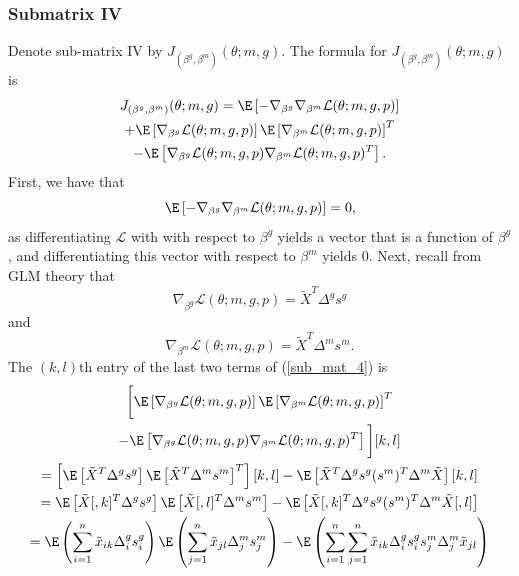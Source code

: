 \documentclass[12pt]{article}
\begin{document}
\begin{appendices}
\subsubsection*{Submatrix IV}
Denote sub-matrix IV by $J_{(\beta^g, \beta^m)}(\theta; m, g)$. The formula for $J_{(\beta^g, \beta^m)}(\theta; m, g)$ is 
\begin{multline}\label{sub_mat_4}
J_{(\beta^g, \beta^m)}(\theta; m,g) = \E \left[-\nabla_{\beta^g} \nabla_{\beta^m} \mathcal{L}(\theta; m, g, p) \right] \\ + \E\left[ \nabla_{\beta^{g}}\mathcal{L}(\theta ; m,g,p) \right] \E \left[\nabla_{\beta^m}\mathcal{L} (\theta ; m,g,p)  \right]^T \\ - \E \left[ \nabla_{\beta^{g}}\mathcal{L} (\theta; m,g,p) \nabla_{\beta^m}\mathcal{L}(\theta; m,g,p)^T  \right].
\end{multline}
First, we have that
\begin{equation}\label{sub_mat_4_1}
\E\left[-\nabla_{\beta^g} \nabla_{\beta^m} \mathcal{L}(\theta; m, g, p) \right] = 0,
\end{equation}
as differentiating $\mathcal{L}$ with with respect to $\beta^g$ yields a vector that is a function of $\beta^g$, and differentiating this vector with respect to $\beta^m$ yields $0$. Next, recall from GLM theory that $$\nabla_{\beta^g} \mathcal{L}(\theta; m, g, p) =   \tilde{X}^T\Delta^g s^g$$ and $$\nabla_{\beta^m} \mathcal{L}(\theta; m, g, p) = \tilde{X}^T \Delta^m s^m.$$ The $(k,l)$th entry of the last two terms of (\ref{sub_mat_4}) is
\begin{multline}\label{sub_mat_4_2}
\bigg[ \E \left[\nabla_{\beta^g} \mathcal{L}(\theta; m, g, p) \right] \E \left[\nabla_{\beta^m} \mathcal{L}(\theta; m, g, p) \right]^T \\ - \E \left[ \nabla_{\beta^g} \mathcal{L}(\theta; m, g, p) \nabla_{\beta^m} \mathcal{L}(\theta; m, g, p)^T \right] \bigg][k,l] \\ 
= \left[ \E \left[ \tilde{X}^T \Delta^g s^g \right]\E \left[ \tilde{X}^T \Delta^m s^m \right]^T\right][k,l] - \E \left[ \tilde{X}^T \Delta^g s^g (s^m)^T \Delta^m \tilde{X} \right][k,l] \\ 
= \E\left[\tilde{X}[,k]^T \Delta^g s^g \right] \E \left[\tilde{X}[,l]^T \Delta^m s^m \right] - \E \left[\tilde{X}[,k]^T \Delta^g s^g (s^m)^T \Delta^m \tilde{X}[,l ] \right] \\
=\E\left( \sum_{i=1}^n \tilde{x}_{ik} \Delta^g_i s^g_i \right) \E \left( \sum_{j=1}^n \tilde{x}_{jl} \Delta^m_j s^m_j \right) - \E \left( \sum_{i=1}^n \sum_{j=1}^n \tilde{x}_{ik} \Delta^g_i s^g_i s^m_j \Delta^m_j \tilde{x}_{jl} \right) \\ 

\end{multline}
\end{appendices}
\end{document}
